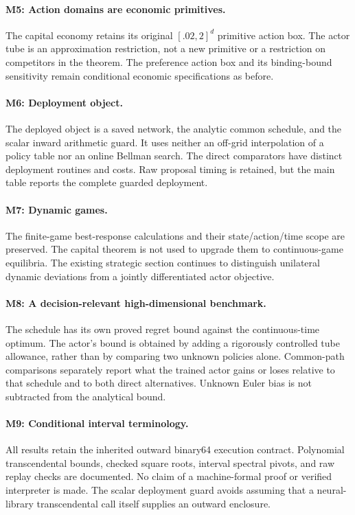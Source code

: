 \paragraph{M5: Action domains are economic primitives.}
The capital economy retains its original $[.02,2]^d$ primitive action box. The actor tube is an approximation restriction, not a new primitive or a restriction on competitors in the theorem. The preference action box and its binding-bound sensitivity remain conditional economic specifications as before.

\paragraph{M6: Deployment object.}
The deployed object is a saved network, the analytic common schedule, and the scalar inward arithmetic guard. It uses neither an off-grid interpolation of a policy table nor an online Bellman search. The direct comparators have distinct deployment routines and costs. Raw proposal timing is retained, but the main table reports the complete guarded deployment.

\paragraph{M7: Dynamic games.}
The finite-game best-response calculations and their state/action/time scope are preserved. The capital theorem is not used to upgrade them to continuous-game equilibria. The existing strategic section continues to distinguish unilateral dynamic deviations from a jointly differentiated actor objective.

\paragraph{M8: A decision-relevant high-dimensional benchmark.}
The schedule has its own proved regret bound against the continuous-time optimum. The actor's bound is obtained by adding a rigorously controlled tube allowance, rather than by comparing two unknown policies alone. Common-path comparisons separately report what the trained actor gains or loses relative to that schedule and to both direct alternatives. Unknown Euler bias is not subtracted from the analytical bound.

\paragraph{M9: Conditional interval terminology.}
All results retain the inherited outward binary64 execution contract. Polynomial transcendental bounds, checked square roots, interval spectral pivots, and raw replay checks are documented. No claim of a machine-formal proof or verified interpreter is made. The scalar deployment guard avoids assuming that a neural-library transcendental call itself supplies an outward enclosure.

